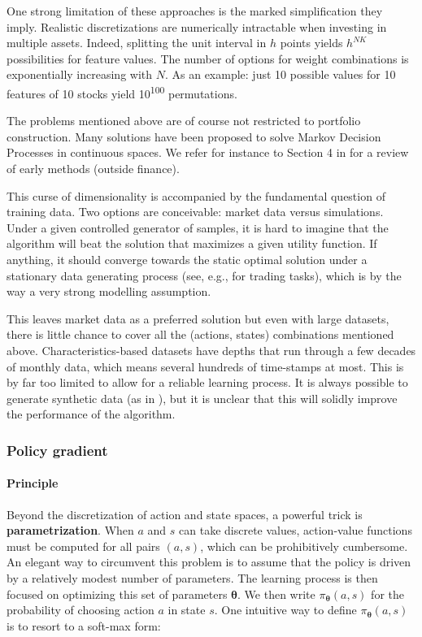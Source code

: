 One strong limitation of these approaches is the marked simplification they imply. Realistic discretizations are numerically intractable when investing in multiple assets. Indeed, splitting the unit interval in $h$ points yields $h^{NK}$ possibilities for feature values. The number of options for weight combinations is exponentially increasing with $N$. As an example: just 10 possible values for 10 features of 10 stocks yield 10\textsuperscript{100} permutations.

The problems mentioned above are of course not restricted to portfolio construction. Many solutions have been proposed to solve Markov Decision Processes in continuous spaces. We refer for instance to Section 4 in \cite{powell2011review} for a review of early methods (outside finance).

This curse of dimensionality is accompanied by the fundamental question of training data. Two options are conceivable: market data versus simulations. Under a given controlled generator of samples, it is hard to imagine that the algorithm will beat the solution that maximizes a given utility function. If anything, it should converge towards the static optimal solution under a stationary data generating process (see, e.g., \cite{chaouki2020deep} for trading tasks), which is by the way a very strong modelling assumption.

This leaves market data as a preferred solution but even with large datasets, there is little chance to cover all the (actions, states) combinations mentioned above. Characteristics-based datasets have depths that run through a few decades of monthly data, which means several hundreds of time-stamps at most. This is by far too limited to allow for a reliable learning process. It is always possible to generate synthetic data (as in \cite{yu2019model}), but it is unclear that this will solidly improve the performance of the algorithm.

\subsubsection{Policy gradient}

\paragraph{Principle}

Beyond the discretization of action and state spaces, a powerful trick is \textbf{parametrization}. When $a$ and $s$ can take discrete values, action-value functions must be computed for all pairs $(a,s)$, which can be prohibitively cumbersome. An elegant way to circumvent this problem is to assume that the policy is driven by a relatively modest number of parameters. The learning process is then focused on optimizing this set of parameters $\boldsymbol{\theta}$. We then write $\pi_{\boldsymbol{\theta}}(a,s)$ for the probability of choosing action $a$ in state $s$. One intuitive way to define $\pi_{\boldsymbol{\theta}}(a,s)$ is to resort to a soft-max form:

